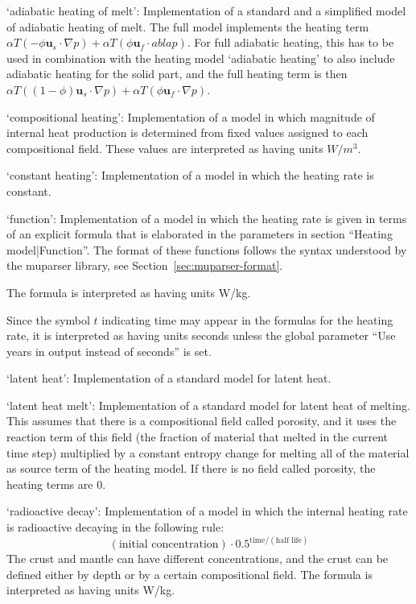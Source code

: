 \begin{itemize}
`adiabatic heating of melt': Implementation of a standard and a simplified model of adiabatic heating of melt. The full model implements the heating term 
$\alpha T (-\phi \mathbf u_s \cdot \nabla p) + \alpha T (\phi \mathbf u_f \cdot 
abla p)$.
For full adiabatic heating, this has to be used in combination with the heating model `adiabatic heating' to also include adiabatic heating for the solid part, and the full heating term is then $\alpha T ((1-\phi) \mathbf u_s \cdot \nabla p) + \alpha T (\phi \mathbf u_f \cdot \nabla p)$.

`compositional heating': Implementation of a model in which magnitude of internal heat production is determined from fixed values assigned to each compositional field. These values are interpreted as having units $W/m^3$.

`constant heating': Implementation of a model in which the heating rate is constant.

`function': Implementation of a model in which the heating rate is given in terms of an explicit formula that is elaborated in the parameters in section ``Heating model|Function''. The format of these functions follows the syntax understood by the muparser library, see Section~\ref{sec:muparser-format}.

The formula is interpreted as having units W/kg.

Since the symbol $t$ indicating time may appear in the formulas for the heating rate, it is interpreted as having units seconds unless the global parameter ``Use years in output instead of seconds'' is set.

`latent heat': Implementation of a standard model for latent heat.

`latent heat melt': Implementation of a standard model for latent heat of melting. This assumes that there is a compositional field called porosity, and it uses the reaction term of this field (the fraction of material that melted in the current time step) multiplied by a constant entropy change for melting all of the material as source term of the heating model.
If there is no field called porosity, the heating terms are 0.

`radioactive decay': Implementation of a model in which the internal heating rate is radioactive decaying in the following rule:
\[(\text{initial concentration})\cdot 0.5^{\text{time}/(\text{half life})}\]
The crust and mantle can have different concentrations, and the crust can be defined either by depth or by a certain compositional field.
The formula is interpreted as having units W/kg.


\end{itemize}

